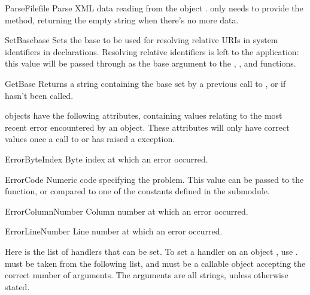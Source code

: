 \begin{methoddesc}{ParseFile}{file}
Parse XML data reading from the object .   only
needs to provide the  method, returning the
empty string when there's no more data.
\end{methoddesc}

\begin{methoddesc}{SetBase}{base}
Sets the base to be used for resolving relative URIs in system identifiers in
declarations.  Resolving relative identifiers is left to the application:
this value will be passed through as the base argument to the
, ,
and  functions. 
\end{methoddesc}

\begin{methoddesc}{GetBase}{}
Returns a string containing the base set by a previous call to
, or  if 
 hasn't been called.
\end{methoddesc}

 objects have the following attributes, containing 
values relating to the most recent error encountered by an
 object. These attributes will only have correct
values once a call to  or 
has raised a  exception.

\begin{datadesc}{ErrorByteIndex} 
Byte index at which an error occurred.
\end{datadesc} 

\begin{datadesc}{ErrorCode} 
Numeric code specifying the problem.  This value can be passed to the
 function, or compared to one of the constants
defined in the  submodule.
\end{datadesc}

\begin{datadesc}{ErrorColumnNumber} 
Column number at which an error occurred.
\end{datadesc}

\begin{datadesc}{ErrorLineNumber}
Line number at which an error occurred.
\end{datadesc}

Here is the list of handlers that can be set.  To set a handler on an
 object , use
.   must
be taken from the following list, and  must be a callable
object accepting the correct number of arguments.  The arguments are
all strings, unless otherwise stated.

